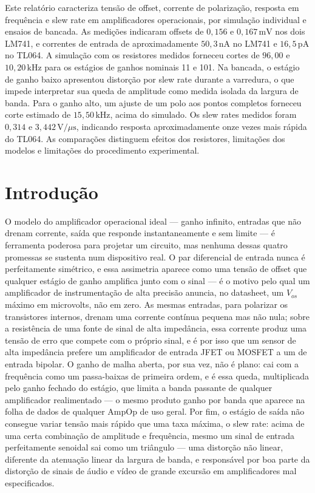 \documentclass[11pt,a4paper]{article}
\begin{document}
\capa

\begin{resumo}
Este relatório caracteriza tensão de offset, corrente de polarização, resposta em frequência
e slew rate em amplificadores operacionais, por simulação individual e ensaios de bancada.
As medições indicaram offsets de \(0{,}156\) e \(0{,}167\,\text{mV}\) nos dois LM741,
e correntes de entrada de aproximadamente \(50{,}3\,\text{nA}\) no LM741 e
\(16{,}5\,\text{pA}\) no TL064. A simulação com os resistores medidos forneceu cortes de
\(96{,}00\) e \(10{,}20\,\text{kHz}\) para os estágios de ganhos nominais 11 e 101.
Na bancada, o estágio de ganho baixo apresentou distorção por slew rate durante a varredura,
o que impede interpretar sua queda de amplitude como medida isolada da largura de banda.
Para o ganho alto, um ajuste de um polo aos pontos completos forneceu corte estimado de
\(15{,}50\,\text{kHz}\), acima do simulado. Os slew rates medidos foram
\(0{,}314\) e \(3{,}442\,\text{V}/\mu\text{s}\), indicando resposta aproximadamente
onze vezes mais rápida do TL064. As comparações distinguem efeitos dos resistores,
limitações dos modelos e limitações do procedimento experimental.

\end{resumo}

\section{Introdução}

O modelo do amplificador operacional ideal — ganho infinito, entradas que não drenam corrente,
saída que responde instantaneamente e sem limite — é ferramenta poderosa para projetar um
circuito, mas nenhuma dessas quatro promessas se sustenta num dispositivo real. O par
diferencial de entrada nunca é perfeitamente simétrico, e essa assimetria aparece como uma
tensão de offset que qualquer estágio de ganho amplifica junto com o sinal — é o motivo pelo
qual um amplificador de instrumentação de alta precisão anuncia, no datasheet, um \(V_{os}\)
máximo em microvolts, não em zero. As mesmas entradas, para polarizar os transistores internos,
drenam uma corrente contínua pequena mas não nula; sobre a resistência de uma fonte de sinal de
alta impedância, essa corrente produz uma tensão de erro que compete com o próprio sinal, e é
por isso que um sensor de alta impedância prefere um amplificador de entrada JFET ou MOSFET a um
de entrada bipolar. O ganho de malha aberta, por sua vez, não é plano: cai com a frequência como
um passa-baixas de primeira ordem, e é essa queda, multiplicada pelo ganho fechado do estágio,
que limita a banda passante de qualquer amplificador realimentado — o mesmo produto ganho por
banda que aparece na folha de dados de qualquer AmpOp de uso geral. Por fim, o estágio de saída
não consegue variar tensão mais rápido que uma taxa máxima, o slew rate: acima de uma certa
combinação de amplitude e frequência, mesmo um sinal de entrada perfeitamente senoidal sai como
um triângulo — uma distorção não linear, diferente da atenuação linear da largura de banda, e
responsável por boa parte da distorção de sinais de áudio e vídeo de grande excursão em
amplificadores mal especificados.
\end{document}
